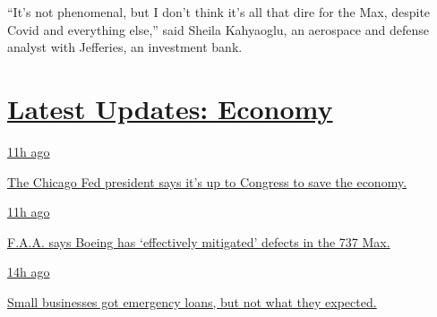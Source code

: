``It's not phenomenal, but I don't think it's all that dire for the Max,
despite Covid and everything else,'' said Sheila Kahyaoglu, an aerospace
and defense analyst with Jefferies, an investment bank.

\hypertarget{latest-updates-economy}{%
\section{\texorpdfstring{\href{https://www.nytimes3xbfgragh.onion/live/2020/08/03/business/stock-market-today-coronavirus?action=click\&pgtype=Article\&state=default\&region=MAIN_CONTENT_1\&context=storylines_live_updates}{Latest
Updates:
Economy}}{Latest Updates: Economy}}\label{latest-updates-economy}}

\href{https://www.nytimes3xbfgragh.onion/live/2020/08/03/business/stock-market-today-coronavirus?action=click\&pgtype=Article\&state=default\&region=MAIN_CONTENT_1\&context=storylines_live_updates\#the-chicago-fed-president-says-its-up-to-congress-to-save-the-economy}{11h
ago}

\href{https://www.nytimes3xbfgragh.onion/live/2020/08/03/business/stock-market-today-coronavirus?action=click\&pgtype=Article\&state=default\&region=MAIN_CONTENT_1\&context=storylines_live_updates\#the-chicago-fed-president-says-its-up-to-congress-to-save-the-economy}{The
Chicago Fed president says it's up to Congress to save the economy.}

\href{https://www.nytimes3xbfgragh.onion/live/2020/08/03/business/stock-market-today-coronavirus?action=click\&pgtype=Article\&state=default\&region=MAIN_CONTENT_1\&context=storylines_live_updates\#faa-says-boeing-has-effectively-mitigated-defects-in-the-737-max}{11h
ago}

\href{https://www.nytimes3xbfgragh.onion/live/2020/08/03/business/stock-market-today-coronavirus?action=click\&pgtype=Article\&state=default\&region=MAIN_CONTENT_1\&context=storylines_live_updates\#faa-says-boeing-has-effectively-mitigated-defects-in-the-737-max}{F.A.A.
says Boeing has `effectively mitigated' defects in the 737 Max.}

\href{https://www.nytimes3xbfgragh.onion/live/2020/08/03/business/stock-market-today-coronavirus?action=click\&pgtype=Article\&state=default\&region=MAIN_CONTENT_1\&context=storylines_live_updates\#small-businesses-got-emergency-loans-but-not-what-they-expected}{14h
ago}

\href{https://www.nytimes3xbfgragh.onion/live/2020/08/03/business/stock-market-today-coronavirus?action=click\&pgtype=Article\&state=default\&region=MAIN_CONTENT_1\&context=storylines_live_updates\#small-businesses-got-emergency-loans-but-not-what-they-expected}{Small
businesses got emergency loans, but not what they expected.}

